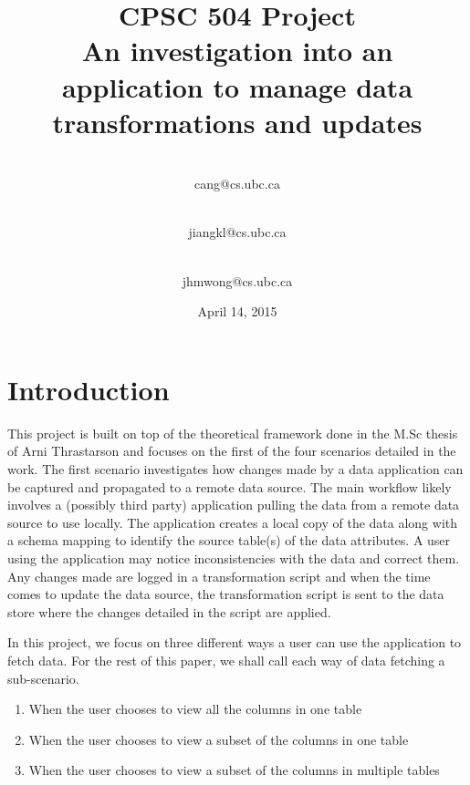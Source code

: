 \documentclass[12pt]{article}
\begin{document}
\begin{titlepage}
\title{\textbf{CPSC 504 Project\\\vspace{3 cm}\Huge{An investigation into an application to manage data transformations and updates}\vspace{2 cm}}}
\date{\vspace{2 cm} April 14, 2015}

\author{
 \\cang@cs.ubc.ca\\
  \and {}\\jiangkl@cs.ubc.ca\\
  \and {}\\jhmwong@cs.ubc.ca\\ 
}
\maketitle
\thispagestyle{empty}
\end{titlepage}

\newpage
\section{Introduction}
\label{sec:introduction}
This project is built on top of the theoretical framework done in the M.Sc thesis of Arni Thrastarson \cite{arniThesis} and focuses on the first of the four scenarios detailed in the work. The first scenario investigates how changes made by a data application can be captured and propagated to a remote data source. The main workflow likely involves a (possibly third party) application pulling the data from a remote data source to use locally. The application creates a local copy of the data along with a schema mapping to identify the source table(s) of the data attributes. A user using the application may notice inconsistencies with the data and correct them. Any changes made are logged in a transformation script and when the time comes to update the data source, the transformation script is sent to the data store where the changes detailed in the script are applied.

In this project, we focus on three different ways a user can use the application to fetch data. For the rest of this paper, we shall call each way of data fetching a sub-scenario. 
\begin{enumerate}
	\item {When the user chooses to view all the columns in one table}
	\item {When the user chooses to view a subset of the columns in one table}
	\item {When the user chooses to view a subset of the columns in multiple tables}
\end{enumerate}
\end{document}
